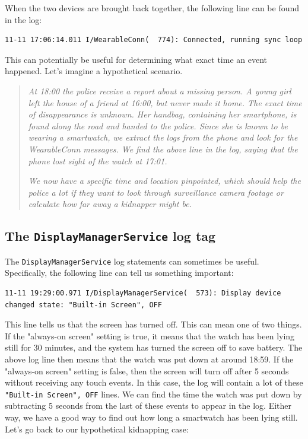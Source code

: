 \documentclass[a4paper,11pt,dvips]{article}
\begin{document}
\noindent
When the two devices are brought back together, the following line can be found in the log:

\scriptsize
\begin{verbatim}
11-11 17:06:14.011 I/WearableConn(  774): Connected, running sync loop
\end{verbatim}
\normalsize

\noindent
This can potentially be useful for determining what exact time an event happened. Let's imagine a hypothetical scenario.

\begin{quote}
\textit{At 18:00 the police receive a report about a missing person. A young girl left the house of a friend at 16:00, but never made it home. The exact time of disappearance is unknown. Her handbag, containing her smartphone, is found along the road and handed to the police. Since she is known to be wearing a smartwatch, we extract the logs from the phone and look for the WearableConn messages. We find the above line in the log, saying that the phone lost sight of the watch at 17:01.}

\textit{We now have a specific time and location pinpointed, which should help the police a lot if they want to look through surveillance camera footage or calculate how far away a kidnapper might be.}
\end{quote}


\subsection{The \texttt{DisplayManagerService} log tag}

The \texttt{DisplayManagerService} log statements can sometimes be useful. Specifically, the following line can tell us something important:

\scriptsize
\begin{verbatim}
11-11 19:29:00.971 I/DisplayManagerService(  573): Display device changed state: "Built-in Screen", OFF
\end{verbatim}
\normalsize

\noindent
This line tells us that the screen has turned off. This can mean one of two things. If the "always-on screen" setting is true, it means that the watch has been lying still for 30 minutes, and the system has turned the screen off to save battery. The above log line then means that the watch was put down at around 18:59. If the "always-on screen" setting is false, then the screen will turn off after 5 seconds without receiving any touch events. In this case, the log will contain a lot of these \texttt{"Built-in Screen", OFF} lines. We can find the time the watch was put down by subtracting 5 seconds from the last of these events to appear in the log. Either way, we have a good way to find out how long a smartwatch has been lying still. Let's go back to our hypothetical kidnapping case:
\end{document}
